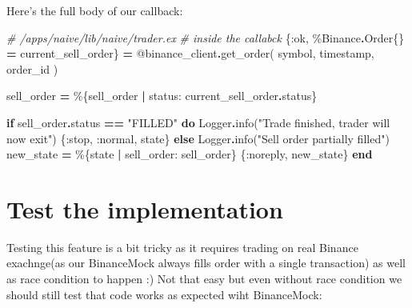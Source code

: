 \documentclass[
  oneside]{book}
\newenvironment{Shaded}{\begin{snugshade}}{\end{snugshade}}
\newcommand{\CommentTok}[1]{\textcolor[rgb]{0.56,0.35,0.01}{\textit{#1}}}
\newcommand{\ConstantTok}[1]{\textcolor[rgb]{0.00,0.00,0.00}{#1}}
\newcommand{\ControlFlowTok}[1]{\textcolor[rgb]{0.13,0.29,0.53}{\textbf{#1}}}
\newcommand{\KeywordTok}[1]{\textcolor[rgb]{0.13,0.29,0.53}{\textbf{#1}}}
\newcommand{\NormalTok}[1]{#1}
\newcommand{\OperatorTok}[1]{\textcolor[rgb]{0.81,0.36,0.00}{\textbf{#1}}}
\newcommand{\OtherTok}[1]{\textcolor[rgb]{0.56,0.35,0.01}{#1}}
\newcommand{\StringTok}[1]{\textcolor[rgb]{0.31,0.60,0.02}{#1}}
\newcommand{\VariableTok}[1]{\textcolor[rgb]{0.00,0.00,0.00}{#1}}
\begin{document}
Here's the full body of our callback:

\begin{Shaded}
\begin{Highlighting}[]
    \CommentTok{\# /apps/naive/lib/naive/trader.ex}
    \CommentTok{\# inside the callabck}
\NormalTok{    \{}\VariableTok{:ok}\NormalTok{, \%}\ConstantTok{Binance}\OperatorTok{.}\ConstantTok{Order}\NormalTok{\{\} }\OperatorTok{=}\NormalTok{ current\_sell\_order\} }\OperatorTok{=}
      \OtherTok{@binance\_client}\OperatorTok{.}\NormalTok{get\_order(}
\NormalTok{        symbol,}
\NormalTok{        timestamp,}
\NormalTok{        order\_id}
\NormalTok{      )}

\NormalTok{    sell\_order }\OperatorTok{=}\NormalTok{ \%\{sell\_order }\OperatorTok{|} \VariableTok{status:}\NormalTok{ current\_sell\_order}\OperatorTok{.}\NormalTok{status\}}

    \ControlFlowTok{if}\NormalTok{ sell\_order}\OperatorTok{.}\NormalTok{status }\OperatorTok{==} \StringTok{"FILLED"} \KeywordTok{do}
      \ConstantTok{Logger}\OperatorTok{.}\NormalTok{info(}\StringTok{"Trade finished, trader will now exit"}\NormalTok{)}
\NormalTok{      \{}\VariableTok{:stop}\NormalTok{, }\VariableTok{:normal}\NormalTok{, state\}}
    \ControlFlowTok{else}
      \ConstantTok{Logger}\OperatorTok{.}\NormalTok{info(}\StringTok{"Sell order partially filled"}\NormalTok{)}
\NormalTok{      new\_state }\OperatorTok{=}\NormalTok{ \%\{state }\OperatorTok{|} \VariableTok{sell\_order:}\NormalTok{ sell\_order\}}
\NormalTok{      \{}\VariableTok{:noreply}\NormalTok{, new\_state\}}
    \KeywordTok{end}
\end{Highlighting}
\end{Shaded}

\hypertarget{test-the-implementation-1}{%
\section{Test the implementation}\label{test-the-implementation-1}}

Testing this feature is a bit tricky as it requires trading on real Binance exachnge(as our BinanceMock always fills order with a single transaction) as well as race condition to happen :) Not that easy but even without race condition we should still test that code works as expected wiht BinanceMock:
\end{document}

